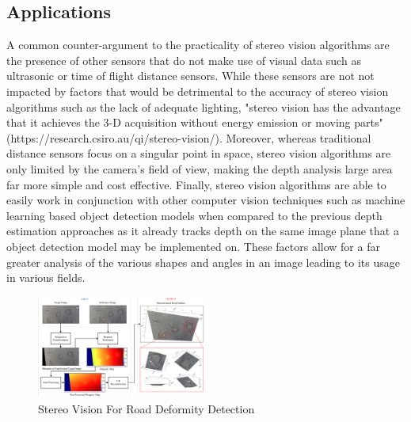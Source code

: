 \documentclass[11pt]{scrartcl}
\begin{document}
\subsection{Applications}
A common counter-argument to the practicality of stereo vision algorithms
are the presence of other sensors that do not make use of visual data such
as ultrasonic or time of flight distance sensors. While these sensors are not
not impacted by factors that would be detrimental to the accuracy of stereo
vision algorithms such as the lack of adequate lighting,
"stereo vision has the advantage that it achieves the 3-D acquisition without
energy emission or moving parts" (https://research.csiro.au/qi/stereo-vision/). Moreover,
whereas traditional distance sensors focus on a singular point in space, stereo vision
algorithms are only limited by the camera's field of view, making the depth analysis
large area far more simple and cost effective. Finally, stereo vision algorithms are able
to easily work in conjunction with other
computer vision techniques such as machine learning based object detection
models when compared to the previous depth estimation approaches as it already
tracks depth on the same image plane that a object detection model may be implemented on.
These factors allow for a far greater analysis of the
various shapes and angles in an image leading to its usage in various fields.
\\
\begin{figure}
  \centering
  \includegraphics[width=0.5\textwidth]{img1.png}
  \caption{\label{fig:frog1}Stereo Vision For Road Deformity Detection}
\end{figure}
\end{document}
